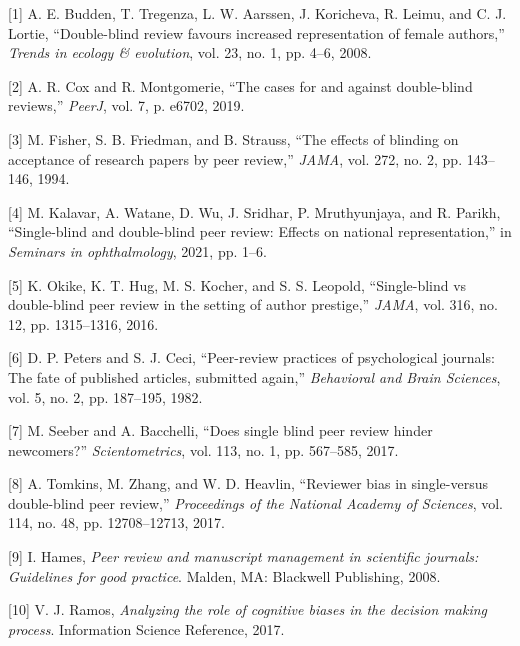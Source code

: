 \documentclass[12pt]{article}
\begin{document}
\hypertarget{refs}{}
\leavevmode\hypertarget{ref-budden08:double}{}%
{[}1{]} A. E. Budden, T. Tregenza, L. W. Aarssen, J. Koricheva, R. Leimu, and C. J. Lortie, ``Double-blind review favours increased representation of female authors,'' \emph{Trends in ecology \& evolution}, vol. 23, no. 1, pp. 4--6, 2008.

\leavevmode\hypertarget{ref-cox19:cases}{}%
{[}2{]} A. R. Cox and R. Montgomerie, ``The cases for and against double-blind reviews,'' \emph{PeerJ}, vol. 7, p. e6702, 2019.

\leavevmode\hypertarget{ref-fisher94:effects}{}%
{[}3{]} M. Fisher, S. B. Friedman, and B. Strauss, ``The effects of blinding on acceptance of research papers by peer review,'' \emph{JAMA}, vol. 272, no. 2, pp. 143--146, 1994.

\leavevmode\hypertarget{ref-kalavar21:single}{}%
{[}4{]} M. Kalavar, A. Watane, D. Wu, J. Sridhar, P. Mruthyunjaya, and R. Parikh, ``Single-blind and double-blind peer review: Effects on national representation,'' in \emph{Seminars in ophthalmology}, 2021, pp. 1--6.

\leavevmode\hypertarget{ref-okike16:single}{}%
{[}5{]} K. Okike, K. T. Hug, M. S. Kocher, and S. S. Leopold, ``Single-blind vs double-blind peer review in the setting of author prestige,'' \emph{JAMA}, vol. 316, no. 12, pp. 1315--1316, 2016.

\leavevmode\hypertarget{ref-peters82:peer}{}%
{[}6{]} D. P. Peters and S. J. Ceci, ``Peer-review practices of psychological journals: The fate of published articles, submitted again,'' \emph{Behavioral and Brain Sciences}, vol. 5, no. 2, pp. 187--195, 1982.

\leavevmode\hypertarget{ref-seeber17:newcomers}{}%
{[}7{]} M. Seeber and A. Bacchelli, ``Does single blind peer review hinder newcomers?'' \emph{Scientometrics}, vol. 113, no. 1, pp. 567--585, 2017.

\leavevmode\hypertarget{ref-tomkins17:reviewer}{}%
{[}8{]} A. Tomkins, M. Zhang, and W. D. Heavlin, ``Reviewer bias in single-versus double-blind peer review,'' \emph{Proceedings of the National Academy of Sciences}, vol. 114, no. 48, pp. 12708--12713, 2017.

\leavevmode\hypertarget{ref-hames08:peer}{}%
{[}9{]} I. Hames, \emph{Peer review and manuscript management in scientific journals: Guidelines for good practice}. Malden, MA: Blackwell Publishing, 2008.

\leavevmode\hypertarget{ref-ramos17:biases}{}%
{[}10{]} V. J. Ramos, \emph{Analyzing the role of cognitive biases in the decision making process}. Information Science Reference, 2017.
\end{document}
